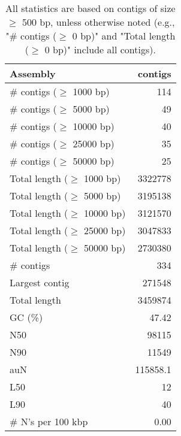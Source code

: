 \documentclass[12pt,a4paper]{article}
\begin{document}
\begin{table}[ht]
\begin{center}
\caption{All statistics are based on contigs of size $\geq$ 500 bp, unless otherwise noted (e.g., "\# contigs ($\geq$ 0 bp)" and "Total length ($\geq$ 0 bp)" include all contigs).}
\begin{tabular}{|l*{1}{|r}|}
\hline
Assembly & contigs \\ \hline
\# contigs ($\geq$ 1000 bp) & 114 \\ \hline
\# contigs ($\geq$ 5000 bp) & 49 \\ \hline
\# contigs ($\geq$ 10000 bp) & 40 \\ \hline
\# contigs ($\geq$ 25000 bp) & 35 \\ \hline
\# contigs ($\geq$ 50000 bp) & 25 \\ \hline
Total length ($\geq$ 1000 bp) & 3322778 \\ \hline
Total length ($\geq$ 5000 bp) & 3195138 \\ \hline
Total length ($\geq$ 10000 bp) & 3121570 \\ \hline
Total length ($\geq$ 25000 bp) & 3047833 \\ \hline
Total length ($\geq$ 50000 bp) & 2730380 \\ \hline
\# contigs & 334 \\ \hline
Largest contig & 271548 \\ \hline
Total length & 3459874 \\ \hline
GC (\%) & 47.42 \\ \hline
N50 & 98115 \\ \hline
N90 & 11549 \\ \hline
auN & 115858.1 \\ \hline
L50 & 12 \\ \hline
L90 & 40 \\ \hline
\# N's per 100 kbp & 0.00 \\ \hline
\end{tabular}
\end{center}
\end{table}
\end{document}
